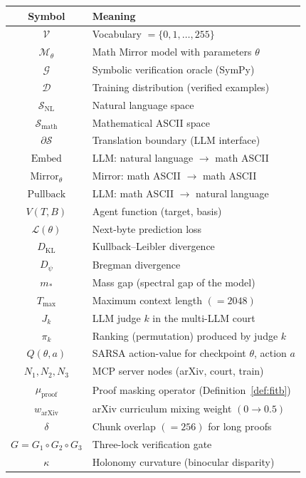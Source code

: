 \documentclass[11pt,a4paper]{article}
\newcommand{\cM}{\mathcal{M}}
\newcommand{\cV}{\mathcal{V}}
\newcommand{\cD}{\mathcal{D}}
\newcommand{\cL}{\mathcal{L}}
\newcommand{\cG}{\mathcal{G}}
\newcommand{\cS}{\mathcal{S}}
\newcommand{\DKL}{D_{\mathrm{KL}}}
\newcommand{\Breg}{D_\psi}
\newcommand{\Embed}{\mathrm{Embed}}
\newcommand{\Pullback}{\mathrm{Pullback}}
\newcommand{\Mirror}{\mathrm{Mirror}}
\begin{document}
\begin{center}
\small
\renewcommand{\arraystretch}{1.2}
\begin{tabular}{@{}cl@{}}
\toprule
\textbf{Symbol} & \textbf{Meaning} \\
\midrule
$\cV$ & Vocabulary $= \{0, 1, \ldots, 255\}$ \\
$\cM_\theta$ & Math Mirror model with parameters $\theta$ \\
$\cG$ & Symbolic verification oracle (SymPy) \\
$\cD$ & Training distribution (verified examples) \\
$\cS_{\text{NL}}$ & Natural language space \\
$\cS_{\text{math}}$ & Mathematical ASCII space \\
$\partial\cS$ & Translation boundary (LLM interface) \\
$\Embed$ & LLM: natural language $\to$ math ASCII \\
$\Mirror_\theta$ & Mirror: math ASCII $\to$ math ASCII \\
$\Pullback$ & LLM: math ASCII $\to$ natural language \\
$V(T, B)$ & Agent function (target, basis) \\
$\cL(\theta)$ & Next-byte prediction loss \\
$\DKL$ & Kullback--Leibler divergence \\
$\Breg$ & Bregman divergence \\
$m_*$ & Mass gap (spectral gap of the model) \\
$T_{\max}$ & Maximum context length $(= 2048)$ \\
$J_k$ & LLM judge $k$ in the multi-LLM court \\
$\pi_k$ & Ranking (permutation) produced by judge $k$ \\
$Q(\theta, a)$ & SARSA action-value for checkpoint $\theta$, action $a$ \\
$N_1, N_2, N_3$ & MCP server nodes (arXiv, court, train) \\
$\mu_{\text{proof}}$ & Proof masking operator (Definition~\ref{def:fitb}) \\
$w_{\text{arXiv}}$ & arXiv curriculum mixing weight $(0 \to 0.5)$ \\
$\delta$ & Chunk overlap $(= 256)$ for long proofs \\
$G = G_1 \circ G_2 \circ G_3$ & Three-lock verification gate \\
$\kappa$ & Holonomy curvature (binocular disparity) \\

\end{tabular}
\end{center}
\end{document}
